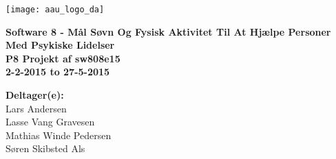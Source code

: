 \hspace*{-1cm}\parbox[b][\textheight][t]{\textwidth}
{

\begin{center}
	\texttt{[image: aau\_logo\_da]}\\
	\vspace{0.25cm}
\end{center} 

\vspace{1cm}
\begin{center}

\textbf{\Huge {Software 8 - Mål Søvn Og Fysisk Aktivitet Til At Hjælpe Personer Med Psykiske Lidelser}} \\ \vspace{0.5cm}
\textbf{\Large P8 Projekt af sw808e15}\\ \vspace{0.5cm}
\textbf{\large 2-2-2015 to 27-5-2015}\\
\end{center}



\vspace{0.25cm}
\begin{center}
\item {\textbf{Deltager(e):}} \\
Lars Andersen\\
Lasse Vang Gravesen\\
Mathias Winde Pedersen\\
Søren Skibsted Als
\end{center}

\thispagestyle{empty}

\newpage
\thispagestyle{empty}
\mbox{}
}